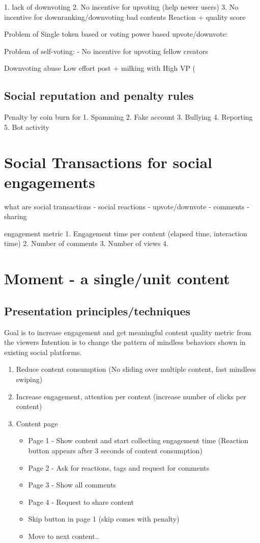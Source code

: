 \documentclass[a4paper]{article}
\begin{document}
   1. lack of downvoting
   2. No incentive for upvoting (help newer users)
   3. No incentive for downranking/downvoting bad contents
  Reaction + quality score
  
  Problem of Single token based or voting power based upvote/downvote:
  
  Problem of self-voting:
     - No incentive for upvoting fellow creators
     
  Downvoting abuse
  Low effort post + milking with High VP (
  

\subsection{Social reputation and penalty rules}
Penalty by coin burn for 
  1. Spamming
  2. Fake account
  3. Bullying
  4. Reporting
  5. Bot activity
  


\section{Social Transactions for social engagements}
what are social transactions
 - social reactions 
 - upvote/downvote
 - comments
 - sharing

engagement metric
    1. Engagement time per content (elapsed time, interaction time)
    2. Number of comments
    3. Number of views
    4. 



\section{Moment - a single/unit content}
\subsection{Presentation principles/techniques}
Goal is to increase engagement and get meaningful content quality metric from the viewers
Intention is to change the pattern of mindless behaviors shown in existing social platforms.
\begin{enumerate}
    \item Reduce content consumption (No sliding over multiple content, fast mindless swiping)
    \item Increase engagement, attention per content (increase number of clicks per content)
    \item Content page
        \begin{itemize}
            \item Page 1 - Show content and start collecting engagement time (Reaction button appears after 3 seconds of content consumption)
            \item Page 2 - Ask for reactions, tags and request for comments
            \item Page 3 - Show all comments
            \item Page 4 - Request to share content
            \item Skip button in page 1 (skip comes with penalty)
            \item Move to next content..
        \end{itemize}
\end{enumerate}
\end{document}
